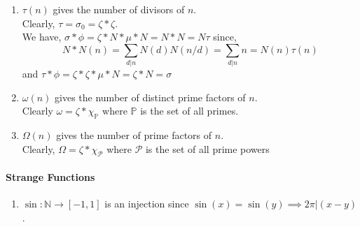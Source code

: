\begin{enumerate}
	\item $\tau(n)$ gives the number of divisors of $n$.\\
	Clearly, $\tau = \sigma_0 = \zeta \ast \zeta$.\\
	We have, $\sigma \ast \phi = \zeta \ast N \ast \mu \ast N =  N \ast N = N \tau$ since,
		$$ N \ast N(n)= \sum_{d|n} N(d)N(n/d) = \sum_{d|n} n = N(n) \tau(n)$$
	and $\tau \ast \phi = \zeta \ast \zeta \ast \mu \ast N = \zeta \ast N = \sigma$
	\item $\omega(n)$ gives the number of distinct prime factors of $n$.\\
	Clearly $\omega = \zeta \ast \chi_\mathbb{P}$ where $\mathbb{P}$ is the set of all primes.
	\item $\Omega(n)$ gives the number of prime factors of $n$.\\
	Clearly, $\Omega = \zeta \ast \chi_\mathcal{P}$ where $\mathcal{P}$ is the set of all prime powers 
\end{enumerate}
\paragraph{Strange Functions}
\begin{enumerate}
	\item $\sin : \mathbb{N} \to [-1,1]$ is an injection since $\sin (x) = \sin (y) \implies 2\pi | (x-y)$.
\end{enumerate}
